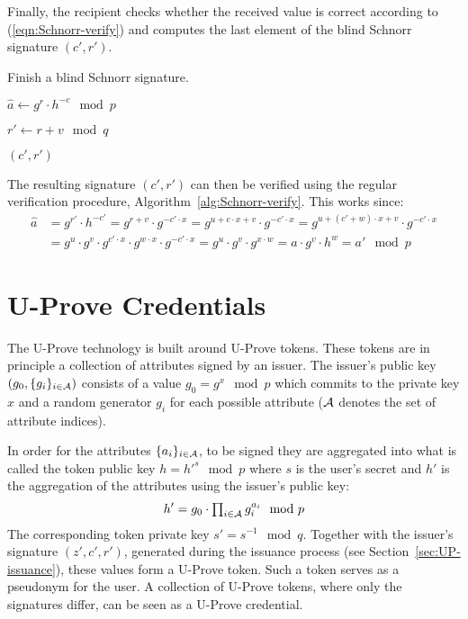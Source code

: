 Finally, the recipient checks whether the received value is correct according to
(\ref{eqn:Schnorr-verify}) and computes the last element of the blind Schnorr
signature $(c', r')$.

\begin{algorithm}
  \caption{Finish a blind Schnorr signature.}
  \label{alg:Schnorr-finish}
  \addtolength{\baselineskip}{1mm}
  \begin{algorithmic}[1]
      \State $\hat{a} \gets g^r \cdot h^{-c} \mod p$
        \Return {}
      \EndIf

      \State $r' \gets r + v \mod q$

      \Return $(c', r')$
    \EndFunction
  \end{algorithmic}
\end{algorithm}

The resulting signature $(c', r')$ can then be verified using the regular
verification procedure, Algorithm~\ref{alg:Schnorr-verify}. This works since:
\begin{align*}
  \hat{a}
  & = g^{r'} \cdot h^{-c'}
  = g^{r + v} \cdot g^{-c' \cdot x}
  = g^{u + c \cdot x + v} \cdot g^{-c' \cdot x}
  = g^{u + (c' + w) \cdot x + v} \cdot g^{-c' \cdot x} \\
  & = g^u \cdot g^v \cdot g^{c' \cdot x} \cdot g^{w \cdot x} \cdot g^{-c' \cdot x}
  = g^u \cdot g^v \cdot g^{x \cdot w}
  = a \cdot g^v \cdot h^w
  = a' \mod p
\end{align*}

\section{U-Prove Credentials}

The U-Prove technology is built around U-Prove tokens. These tokens are in
principle a collection of attributes signed by an issuer. The issuer's public
key $(g_0, \{g_i\}_{i \in \mathcal{A}})$ consists of a value $g_0 = g^x \mod p$ which
commits to the private key $x$ and a random generator $g_i$ for each possible
attribute ($\mathcal{A}$ denotes the set of attribute indices).

In order for the attributes $\{a_i\}_{i \in \mathcal{A}}$, to be signed they are
aggregated into what is called the token public key $h = h'^s \mod p$ where $s$
is the user's secret and $h'$ is the aggregation of the attributes using the
issuer's public key:
\begin{equation}\label{eqn:UP-attribute-aggregation}
  h' = g_0 \cdot \textstyle\prod_{i \in \mathcal{A}} g_i^{a_i} \mod p
\end{equation}
The corresponding token private key $s' = s^{-1} \mod q$. Together with the
issuer's signature $(z', c', r')$, generated during the issuance process (see
Section~\ref{sec:UP-issuance}), these values form a U-Prove token. Such a token
serves as a pseudonym for the user. A collection of U-Prove tokens, where only
the signatures differ, can be seen as a U-Prove credential.

